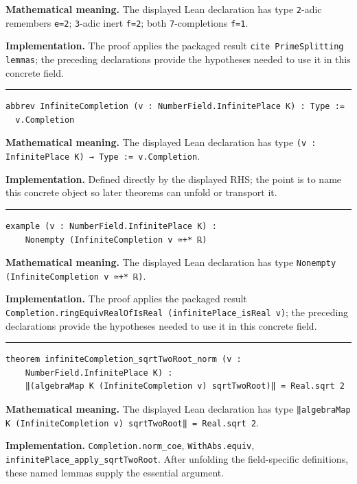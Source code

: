 \documentclass[UTF8,a4paper,11pt,fontset=fandol]{ctexart}
\theoremstyle{definition}
\newcommand{\statementsep}{\par\medskip\hrule\medskip}
\begin{document}
\noindent\textbf{Mathematical meaning.} The displayed Lean declaration has type \texttt{2}-adic remembers \texttt{e=2}; \texttt{3}-adic inert \texttt{f=2}; both \texttt{7}-completions \texttt{f=1}.\par
\noindent\textbf{Implementation.} The proof applies the packaged result \texttt{cite PrimeSplitting lemmas}; the preceding declarations provide the hypotheses needed to use it in this concrete field.\par
\statementsep
\begin{verbatim}
abbrev InfiniteCompletion (v : NumberField.InfinitePlace K) : Type :=
  v.Completion
\end{verbatim}
\noindent\textbf{Mathematical meaning.} The displayed Lean declaration has type \texttt{(v : InfinitePlace K) → Type := v.\allowbreak{}Completion}.\par
\noindent\textbf{Implementation.} Defined directly by the displayed RHS; the point is to name this concrete object so later theorems can unfold or transport it.\par
\statementsep
\begin{verbatim}
example (v : NumberField.InfinitePlace K) :
    Nonempty (InfiniteCompletion v ≃+* ℝ)
\end{verbatim}
\noindent\textbf{Mathematical meaning.} The displayed Lean declaration has type \texttt{Nonempty (InfiniteCompletion v ≃+* ℝ)}.\par
\noindent\textbf{Implementation.} The proof applies the packaged result \texttt{Completion.\allowbreak{}ringEquivRealOfIsReal (infinitePlace\_\allowbreak{}isReal v)}; the preceding declarations provide the hypotheses needed to use it in this concrete field.\par
\statementsep
\begin{verbatim}
theorem infiniteCompletion_sqrtTwoRoot_norm (v :
    NumberField.InfinitePlace K) :
    ‖(algebraMap K (InfiniteCompletion v) sqrtTwoRoot)‖ = Real.sqrt 2
\end{verbatim}
\noindent\textbf{Mathematical meaning.} The displayed Lean declaration has type \texttt{‖algebraMap K (InfiniteCompletion v) sqrtTwoRoot‖ = Real.\allowbreak{}sqrt 2}.\par
\noindent\textbf{Implementation.} \texttt{Completion.\allowbreak{}norm\_\allowbreak{}coe}, \texttt{WithAbs.\allowbreak{}equiv}, \texttt{infinitePlace\_\allowbreak{}apply\_\allowbreak{}sqrtTwoRoot}. After unfolding the field-specific definitions, these named lemmas supply the essential argument.\par
\end{document}
